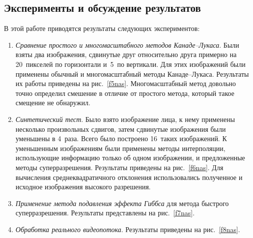 \begin{multicols}{2}
     \section{Эксперименты и обсуждение результатов}

     В этой работе приводятся результаты следующих экспериментов:
     \begin{enumerate}[1.]
     \item \textit{Сравнение простого и многомасштабного методов Канаде--Лукаса}.
Были взяты два изображения, сдвинутые друг относительно друга примерно на
20~пикселей по горизонтали и~5~по вертикали. Для этих изображений были
применены обычный и многомасштабный методы Канаде--Лукаса. Результаты их
работы приведены на рис.~\ref{f5nas}. Многомасштабный метод довольно точно
определил смешение в отличие от простого метода, который такое смещение не
обнаружил.
     \item \textit{Синтетический тест}. Было взято изображение лица, к нему
применены несколько произвольных сдвигов, затем сдвинутые изображения были
уменьшены в 4~раза. Всего было построено 16~таких изображений. К уменьшенным
изоб\-ра\-же\-ни\-ям были применены методы интерполяции, использующие информацию
только об одном изображении, и предложенные методы суперразрешения. Результаты
приведены на рис.~\ref{f6nas}. Для вычисления среднеквадратичного отклонения
использовались полученное и исходное изображения высокого разрешения.
     \item \textit{Применение метода подавления эффекта Гиббса} для метода
быстрого суперразрешения. Результаты представлены на рис.~\ref{f7nas}.
     \item \textit{Обработка реального видеопотока}. Результаты приведены на
рис.~\ref{f8nas}.
\end{enumerate}

\begin{figure*} %
\vspace*{1pt}
\begin{center}
\mbox{%
\epsfxsize=138.178mm
}
\end{center}
\vspace*{-9pt}
\end{figure*}



\end{multicols}
